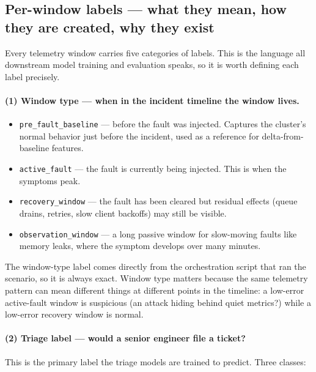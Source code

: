 \subsection{Per-window labels --- what they mean, how they are created, why they exist}

Every telemetry window carries five categories of labels. This is the language all downstream model training and evaluation speaks, so it is worth defining each label precisely.

\paragraph{(1) Window type --- when in the incident timeline the window lives.}

\begin{itemize}
\item \texttt{pre\_fault\_baseline} --- before the fault was injected. Captures the cluster's normal behavior just before the incident, used as a reference for delta-from-baseline features.
\item \texttt{active\_fault} --- the fault is currently being injected. This is when the symptoms peak.
\item \texttt{recovery\_window} --- the fault has been cleared but residual effects (queue drains, retries, slow client backoffs) may still be visible.
\item \texttt{observation\_window} --- a long passive window for slow-moving faults like memory leaks, where the symptom develops over many minutes.
\end{itemize}

The window-type label comes directly from the orchestration script that ran the scenario, so it is always exact. Window type matters because the same telemetry pattern can mean different things at different points in the timeline: a low-error active-fault window is suspicious (an attack hiding behind quiet metrics?) while a low-error recovery window is normal.

\paragraph{(2) Triage label --- would a senior engineer file a ticket?}

This is the primary label the triage models are trained to predict. Three classes:

